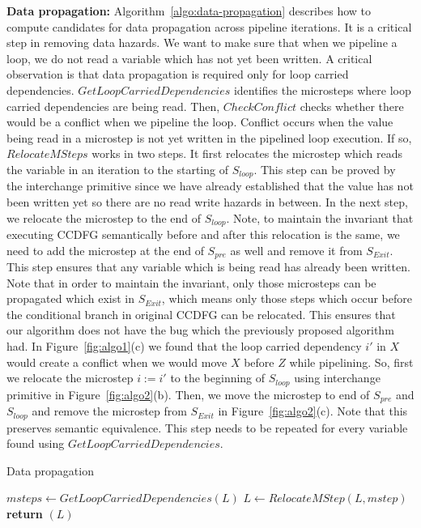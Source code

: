 {\bf Data propagation:} Algorithm~\ref{algo:data-propagation} describes how to compute candidates for data
propagation across pipeline iterations. It is a critical step in removing data hazards. We want to make sure that when we pipeline a loop, we do not read a variable which has not
yet been written. A critical observation is that data propagation is required only for loop carried dependencies.
$GetLoopCarriedDependencies$ identifies the microsteps where loop carried dependencies are being read. Then,
$CheckConflict$ checks whether there would be a conflict when we pipeline the loop.
Conflict occurs when the value being read in a microstep is not yet written in the pipelined loop execution. If so, $RelocateMSteps$ works in two steps. It first relocates the microstep which reads the variable in an iteration to the starting of $S_{loop}$. This step can be proved by the interchange primitive since we have already established that the value has not been written yet so there are no read write hazards in between. In the next step, we relocate the microstep to the end of $S_{loop}$. Note, to maintain the invariant that executing CCDFG semantically before and after this relocation is the same, we need to add the microstep at the end of $S_{pre}$ as well and remove it from $S_{Exit}$. This step ensures that any variable which is being read has already been written. Note that in order to maintain the invariant, only those microsteps can be propagated which exist in $S_{Exit}$, which means only those steps which occur before the conditional branch in original CCDFG can be relocated. This ensures that our algorithm does not have the bug which the previously proposed algorithm had.
In Figure~\ref{fig:algo1}(c) we found that the loop carried dependency $i'$ in $X$ would create a conflict when we would move $X$ before $Z$ while pipelining. So, first we relocate the microstep $i := i'$ to the beginning of $S_{loop}$ using interchange primitive in Figure~\ref{fig:algo2}(b). Then, we move the microstep to end of $S_{pre}$ and $S_{loop}$ and remove the microstep from $S_{Exit}$ in  Figure~\ref{fig:algo2}(c). Note that this preserves semantic equivalence.
This step needs to be repeated for every variable found using $GetLoopCarriedDependencies$.

\begin{algorithm}[H]
\caption{Data propagation} 
\label{algo:data-propagation}
\begin{algorithmic}[1]
\State $msteps \leftarrow GetLoopCarriedDependencies(L)$
\State $L \leftarrow RelocateMStep (L, mstep)$
\EndIf
\EndFor
\State \textbf{return} $(L)$
\EndProcedure
\end{algorithmic}
\end{algorithm}

